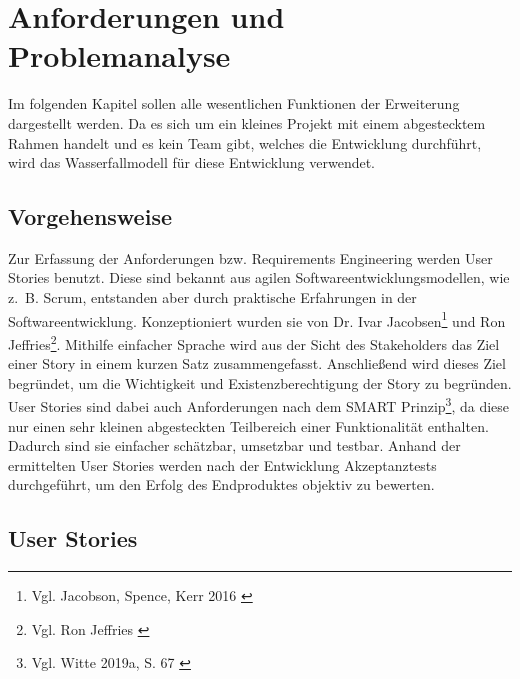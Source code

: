 \chapter{Anforderungen und Problemanalyse}
\label{ch:anforderungen}

Im folgenden Kapitel sollen alle wesentlichen Funktionen der Erweiterung dargestellt werden. Da es sich um ein kleines Projekt mit einem abgestecktem Rahmen handelt und es kein Team gibt, welches die Entwicklung durchführt, wird das Wasserfallmodell für diese Entwicklung verwendet.


\section{Vorgehensweise}

Zur Erfassung der Anforderungen bzw. Requirements Engineering werden User Stories benutzt. Diese sind bekannt aus agilen Softwareentwicklungsmodellen, wie z. B. Scrum, entstanden aber durch praktische Erfahrungen in der Softwareentwicklung.
Konzeptioniert wurden sie von Dr. Ivar Jacobsen\footnote{Vgl. Jacobson, Spence, Kerr 2016 \cite{jacobson2016}} und Ron Jeffries\footnote{Vgl. Ron Jeffries \cite{jeffries2022}}.
Mithilfe einfacher Sprache wird aus der Sicht des Stakeholders das Ziel einer Story in einem kurzen Satz zusammengefasst.
Anschließend wird dieses Ziel begründet, um die Wichtigkeit und Existenzberechtigung der Story zu begründen.
User Stories sind dabei auch Anforderungen nach dem SMART Prinzip\footnote{Vgl. Witte 2019a, S. 67 \cite{witte2016}}, da diese nur einen sehr kleinen abgesteckten Teilbereich einer Funktionalität enthalten.
Dadurch sind sie einfacher schätzbar, umsetzbar und testbar.
Anhand der ermittelten User Stories werden nach der Entwicklung Akzeptanztests durchgeführt, um den Erfolg des Endproduktes objektiv zu bewerten.

\section{User Stories}

